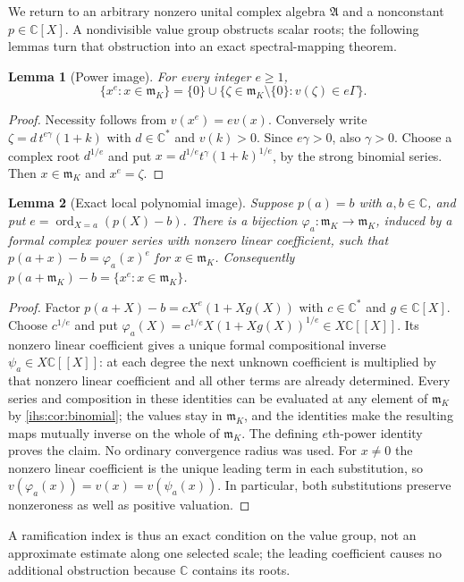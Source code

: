 \documentclass[11pt,a4paper]{article}
\numberwithin{equation}{section}
\newtheorem{lemma}[lemma]{Lemma}
\theoremstyle{definition}
\theoremstyle{remark}
\newcommand{\C}{\mathbb C}
\newcommand{\mK}{\mathfrak m_K}
\newcommand{\Alg}{\mathfrak A}
\begin{document}
We return to an arbitrary nonzero unital complex algebra $\Alg$ and a
nonconstant $p\in\C[X]$. A nondivisible value group obstructs scalar roots;
the following lemmas turn that obstruction into an exact spectral-mapping
theorem.

\begin{lemma}[Power image]\label{ihs:dz:lem:powers}
For every integer $e\ge1$,
\begin{equation}\label{ihs:dz:eq:powers}
 \{x^e:x\in\mK\}=\{0\}\cup\{\zeta\in\mK\setminus\{0\}:v(\zeta)\in e\Gamma\}.
\end{equation}
\end{lemma}
\begin{proof}
Necessity follows from $v(x^e)=ev(x)$. Conversely write
$\zeta=d\,t^{e\gamma}(1+k)$ with $d\in\C^*$ and $v(k)>0$. Since
$e\gamma>0$, also $\gamma>0$. Choose a complex root $d^{1/e}$ and put
$x=d^{1/e}t^\gamma(1+k)^{1/e}$, by the strong binomial series. Then
$x\in\mK$ and $x^e=\zeta$.
\end{proof}

\begin{lemma}[Exact local polynomial image]\label{ihs:dz:lem:local}
Suppose $p(a)=b$ with $a,b\in\C$, and put $e=\operatorname{ord}_{X=a}(p(X)-b)$.
There is a bijection $\varphi_a:\mK\to\mK$, induced by a formal complex power
series with nonzero linear coefficient, such that
$p(a+x)-b=\varphi_a(x)^e$ for $x\in\mK$. Consequently
$p(a+\mK)-b=\{x^e:x\in\mK\}$.
\end{lemma}
\begin{proof}
Factor $p(a+X)-b=cX^e(1+Xg(X))$ with $c\in\C^*$ and $g\in\C[X]$. Choose
$c^{1/e}$ and put $\varphi_a(X)=c^{1/e}X(1+Xg(X))^{1/e}\in X\C[[X]]$. Its
nonzero linear coefficient gives a unique formal compositional inverse
$\psi_a\in X\C[[X]]$: at each degree the next unknown coefficient is
multiplied by that nonzero linear coefficient and all other terms are
already determined. Every series and composition in these identities can be
evaluated at any element of $\mK$ by \cref{ihs:cor:binomial}; the values stay
in $\mK$, and the identities make the resulting maps mutually inverse on the
whole of $\mK$. The defining $e$th-power identity proves the claim. No
ordinary convergence radius was used.
For $x\ne0$ the nonzero linear coefficient is the unique leading term in
each substitution, so $v(\varphi_a(x))=v(x)=v(\psi_a(x))$. In particular,
both substitutions preserve nonzeroness as well as positive valuation.
\end{proof}

A ramification index is thus an exact condition on the value group, not an
approximate estimate along one selected scale; the leading coefficient causes
no additional obstruction because $\C$ contains its roots.
\end{document}
